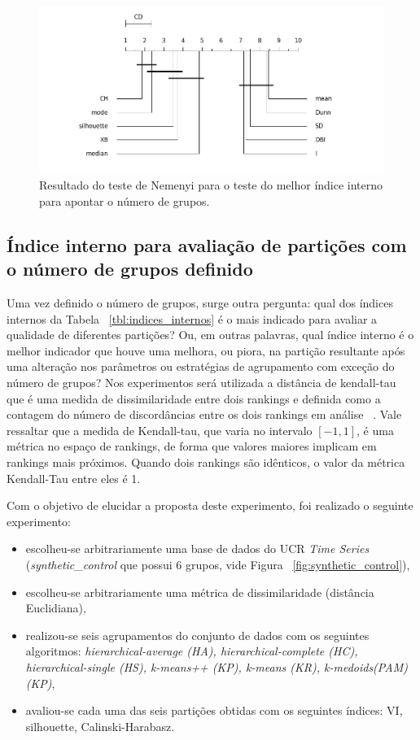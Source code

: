  \begin{figure}
 		\includegraphics[width=\linewidth]{figuras/figura_alteracao_centroid.png}
 	\caption{Resultado do teste de Nemenyi para o teste do melhor índice interno para apontar o número de grupos.}
 \end{figure} \label{fig:resultado_iterativo}


\subsection{Índice interno para avaliação de partições com o número de grupos definido} \label{sec:indice_interno_k_fixo}

Uma vez definido o número de grupos, surge outra pergunta: qual dos índices internos da Tabela ~\ref{tbl:indices_internos} é o mais indicado para avaliar a qualidade de diferentes partições? Ou, em outras palavras, qual índice interno é o melhor indicador que houve uma melhora, ou piora, na partição resultante após uma alteração nos parâmetros ou estratégias de agrupamento com exceção do número de grupos? Nos experimentos será utilizada a distância de kendall-tau que é uma medida de dissimilaridade entre dois rankings e definida como a contagem do número de discordâncias entre os dois rankings em análise ~\parencite{kendall_tau}. Vale ressaltar que a medida de Kendall-tau, que varia no intervalo $[-1,1]$, é uma métrica no espaço de rankings, de forma que valores maiores implicam em rankings mais próximos. Quando dois rankings são idênticos, o valor da métrica Kendall-Tau entre eles é 1.

Com o objetivo de elucidar a proposta deste experimento, foi realizado o seguinte experimento:
\begin{itemize}
	\item escolheu-se arbitrariamente uma base de dados do UCR \emph{Time Series} (\emph{synthetic_control} que possui 6 grupos, vide Figura ~\ref{fig:synthetic_control}),
	\item escolheu-se arbitrariamente uma métrica de dissimilaridade (distância Euclidiana),
	\item realizou-se seis agrupamentos do conjunto de dados com os seguintes algoritmos: \emph{hierarchical-average (HA), hierarchical-complete (HC), hierarchical-single (HS), k-means++ (KP), k-means (KR), k-medoids(PAM)(KP)},
	\item avaliou-se cada uma das seis partições obtidas com os seguintes índices: VI, silhouette, Calinski-Harabasz.
\end{itemize}

